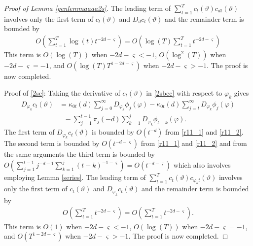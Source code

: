{{\begin{proof}[Proof of Lemma \ref{genlemmaaaa2s}]
The leading term of $\sum_{t = 1}^T c_{t}(\vartheta) c_{d t}(\vartheta)$ involves only the first term of $c_t(\vartheta)$ and $D_{d} c_t(\vartheta)$ and the remainder term is bounded by 
\begin{align*}
    O(\sum_{t=1}^T \log(t) t^{-2d-\varsigma} ) = O(\log(T)\sum_{t=1}^T t^{-2d-\varsigma} ) 
\end{align*}
This term is $O(\log(T))$ when $-2d-\varsigma < -1$, $O(\log^2(T))$ when  $-2d-\varsigma = -1$, and $O(\log(T)  T^{1-2d-\varsigma})$ when $-2d-\varsigma > -1$. The proof is now completed. 

Proof of \eqref{2sc}: 
Taking the derivative of $c_t(\vartheta)$ in \eqref{2sbcc} with respect to $\varphi_k$ gives
\begin{align*}
    D_{\varphi_k}   c_t(\vartheta) &= \kappa_{0t}(d) \sum_{j = 0}^{\infty}  D_{\varphi_k}  \phi_j(\varphi) -  \kappa_{0t}(d)  \sum_{j = t}^{\infty} D_{\varphi_k}  \phi_j(\varphi) \\
      &\ \ \ - \sum_{j = 1}^{t-1} \pi_j(-d) \sum_{k = 1}^j  D_{\varphi_k}  \phi_{t-k}(\varphi) .
\end{align*}
The first term of $ D_{\varphi_k}  c_t(\vartheta)$ is bounded by $O( t^{-d})$ from \eqref{r11_1} and \eqref{r11_2}. The second term is bounded by $O(t^{-d-\varsigma})$ from \eqref{r11_1} and \eqref{r11_2} and from the same arguments the third term is bounded by $O\left(\sum_{j = 1}^{t-1}  j^{-d-1} \sum_{k = 1}^j  (t-k)^{-1-\varsigma}  \right) = O( t^{-d-\varsigma})$ which also involves employing Lemma \ref{series}. 
The leading term of $\sum_{t = 1}^T c_{t}(\vartheta) c_{\varphi_k t}(\vartheta)$ involves only the first term of $c_t(\vartheta)$ and $D_{\varphi_k}   c_t(\vartheta)$ and the remainder term is bounded by 
\begin{align*}
    O(\sum_{t=1}^T  t^{-2d-\varsigma} ) = O(\sum_{t=1}^T t^{-2d-\varsigma} ) .
\end{align*}
This term is $O(1)$ when $-2d-\varsigma < -1$, $O(\log(T))$ when  $-2d-\varsigma = -1$, and $O(T^{1-2d-\varsigma})$ when $-2d-\varsigma > -1$. The proof is now completed. 


\end{proof}}}
